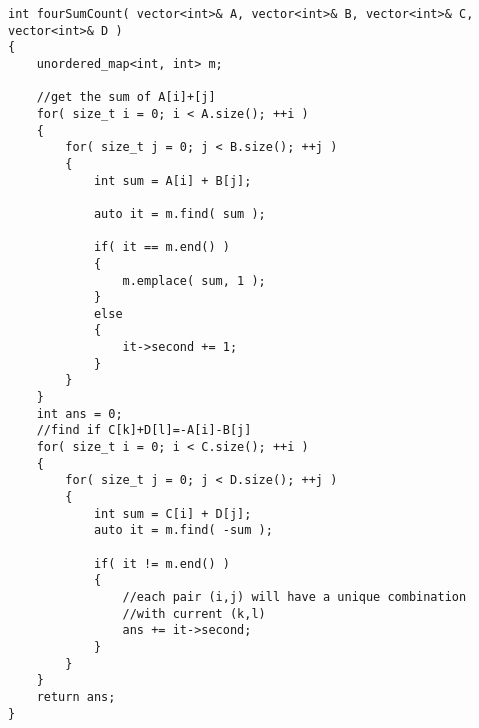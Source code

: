 \setcounter{lstlisting}{0}
\begin{lstlisting}[style=customc, caption={hash map}]
int fourSumCount( vector<int>& A, vector<int>& B, vector<int>& C, vector<int>& D )
{
    unordered_map<int, int> m;

    //get the sum of A[i]+[j]
    for( size_t i = 0; i < A.size(); ++i )
    {
        for( size_t j = 0; j < B.size(); ++j )
        {
            int sum = A[i] + B[j];

            auto it = m.find( sum );

            if( it == m.end() )
            {
                m.emplace( sum, 1 );
            }
            else
            {
                it->second += 1;
            }
        }
    }
    int ans = 0;
    //find if C[k]+D[l]=-A[i]-B[j]
    for( size_t i = 0; i < C.size(); ++i )
    {
        for( size_t j = 0; j < D.size(); ++j )
        {
            int sum = C[i] + D[j];
            auto it = m.find( -sum );

            if( it != m.end() )
            {
                //each pair (i,j) will have a unique combination
                //with current (k,l)
                ans += it->second;
            }
        }
    }
    return ans;
}
\end{lstlisting}
